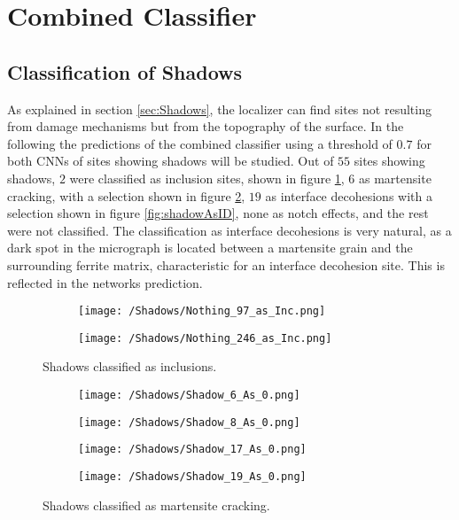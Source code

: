 \section{Combined Classifier}
%

\subsection{Classification of Shadows}
\label{sec:Robustness}
As explained in section \ref{sec:Shadows}, the localizer can find sites not resulting from damage mechanisms but from the topography of the surface. In the following the predictions of the combined classifier using a threshold of $0.7$ for both CNNs of sites showing shadows will be studied. Out of $55$ sites showing shadows, $2$ were classified as inclusion sites, shown in figure \ref{fig:shadowAsInc}, $6$ as martensite cracking, with a selection shown in figure \ref{fig:shadowAsMC}, $19$ as interface decohesions with a selection shown in figure \ref{fig:shadowAsID}, none as notch effects, and the rest were not classified. The classification as interface decohesions is very natural, as a dark spot in the micrograph is located between a martensite grain and the surrounding ferrite matrix, characteristic for an interface decohesion site. This is reflected in the networks prediction.

\begin{figure}[H]
\centering
\begin{subfigure}{0.24\textwidth}
\texttt{[image: /Shadows/Nothing\_97\_as\_Inc.png]}
\caption{}
\end{subfigure}
\centering
\begin{subfigure}{0.24\textwidth}
\texttt{[image: /Shadows/Nothing\_246\_as\_Inc.png]}
\caption{}
\end{subfigure}
\caption{Shadows classified as inclusions.}
\label{fig:shadowAsInc}
\end{figure}

\begin{figure}[H]
\centering
\begin{subfigure}{0.24\textwidth}
\texttt{[image: /Shadows/Shadow\_6\_As\_0.png]}
\caption{}
\end{subfigure}
\centering
\begin{subfigure}{0.24\textwidth}
\texttt{[image: /Shadows/Shadow\_8\_As\_0.png]}
\caption{}
\end{subfigure}
\centering
\begin{subfigure}{0.24\textwidth}
\texttt{[image: /Shadows/Shadow\_17\_As\_0.png]}
\caption{}
\end{subfigure}
\centering
\begin{subfigure}{0.24\textwidth}
\texttt{[image: /Shadows/Shadow\_19\_As\_0.png]}
\caption{}
\end{subfigure}
\caption{Shadows classified as martensite cracking.}
\label{fig:shadowAsMC}
\end{figure}

